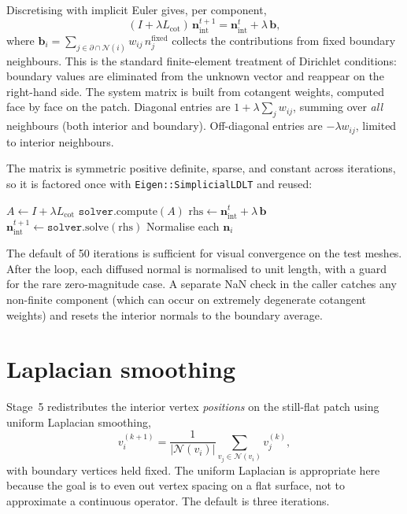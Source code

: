 Discretising with implicit Euler gives, per component,
\begin{equation}
(I + \lambda L_{\text{cot}})\, \mathbf{n}^{t+1}_{\text{int}} = \mathbf{n}^{t}_{\text{int}} + \lambda\, \mathbf{b},
\end{equation}
where $\mathbf{b}_i = \sum_{j \in \partial \cap \mathcal{N}(i)} w_{ij}\, n_j^{\text{fixed}}$ collects the contributions from fixed boundary neighbours. This is the standard finite-element treatment of Dirichlet conditions: boundary values are eliminated from the unknown vector and reappear on the right-hand side. The system matrix is built from cotangent weights, computed face by face on the patch. Diagonal entries are $1 + \lambda \sum_j w_{ij}$, summing over \emph{all} neighbours (both interior and boundary). Off-diagonal entries are $-\lambda w_{ij}$, limited to interior neighbours.

The matrix is symmetric positive definite, sparse, and constant across iterations, so it is factored once with \texttt{Eigen::SimplicialLDLT} and reused:

\begin{algorithm}[H]
\caption{Iterative implicit Euler}
\begin{algorithmic}[1]
\State $A \gets I + \lambda L_{\text{cot}}$
\State $\texttt{solver}.\text{compute}(A)$ 
    \State $\text{rhs} \gets \mathbf{n}^{t}_{\text{int}} + \lambda\, \mathbf{b}$
    \State $\mathbf{n}^{t+1}_{\text{int}} \gets \texttt{solver}.\text{solve}(\text{rhs})$
\EndFor
\State Normalise each $\mathbf{n}_i$
\end{algorithmic}
\end{algorithm}

The default of 50 iterations is sufficient for visual convergence on the test meshes. After the loop, each diffused normal is normalised to unit length, with a guard for the rare zero-magnitude case. A separate NaN check in the caller catches any non-finite component (which can occur on extremely degenerate cotangent weights) and resets the interior normals to the boundary average.

\section{Laplacian smoothing}

Stage~5 redistributes the interior vertex \emph{positions} on the still-flat patch using uniform Laplacian smoothing,
\begin{equation}
v_i^{(k+1)} = \frac{1}{|\mathcal{N}(v_i)|} \sum_{v_j \in \mathcal{N}(v_i)} v_j^{(k)},
\end{equation}
with boundary vertices held fixed. The uniform Laplacian is appropriate here because the goal is to even out vertex spacing on a flat surface, not to approximate a continuous operator. The default is three iterations.

